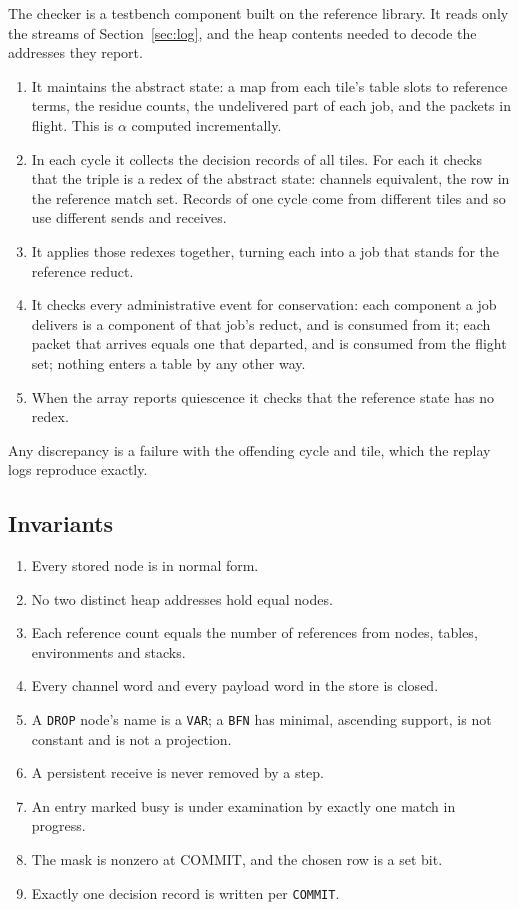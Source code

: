 \documentclass[11pt]{article}
\newcommand{\kw}[1]{\texttt{#1}}
\theoremstyle{definition}
\theoremstyle{remark}
\begin{document}
The checker is a testbench component built on the reference library. It reads
only the streams of Section~\ref{sec:log}, and the heap contents needed to
decode the addresses they report.
\begin{enumerate}
\item It maintains the abstract state: a map from each tile's table slots to
reference terms, the residue counts, the undelivered part of each job, and
the packets in flight. This is $\alpha$ computed incrementally.
\item In each cycle it collects the decision records of all tiles. For each
it checks that the triple is a redex of the abstract state: channels
equivalent, the row in the reference match set. Records of one cycle come
from different tiles and so use different sends and receives.
\item It applies those redexes together, turning each into a job that stands
for the reference reduct.
\item It checks every administrative event for conservation: each component
a job delivers is a component of that job's reduct, and is consumed from it;
each packet that arrives equals one that departed, and is consumed from the
flight set; nothing enters a table by any other way.
\item When the array reports quiescence it checks that the reference state
has no redex.
\end{enumerate}
Any discrepancy is a failure with the offending cycle and tile, which the
replay logs reproduce exactly.

\subsection{Invariants}\label{sec:invariants}

\begin{enumerate}[label=I\arabic*.]
\item Every stored node is in normal form.
\item No two distinct heap addresses hold equal nodes.
\item Each reference count equals the number of references from nodes,
tables, environments and stacks.
\item Every channel word and every payload word in the store is closed.
\item A \kw{DROP} node's name is a \kw{VAR}; a \kw{BFN} has minimal,
ascending support, is not constant and is not a projection.
\item A persistent receive is never removed by a step.
\item An entry marked busy is under examination by exactly one match in
progress.
\item The mask is nonzero at COMMIT, and the chosen row is a set bit.
\item Exactly one decision record is written per \kw{COMMIT}.
\end{enumerate}
\end{document}
